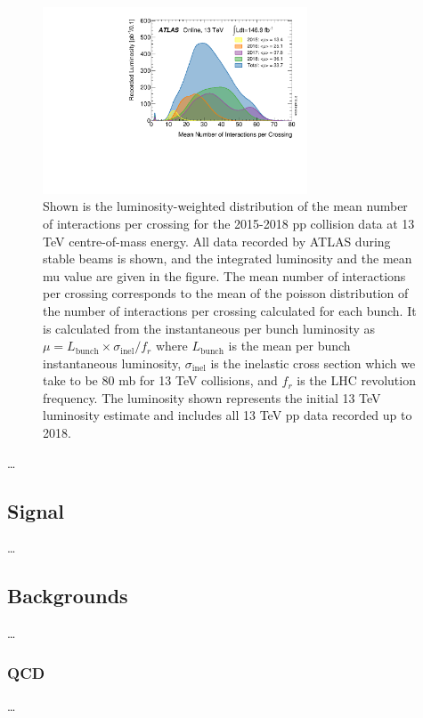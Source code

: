 \begin{figure}[htbp!]
\begin{center}
    \includegraphics[width=0.7\textwidth]{mu_2015_2018}
\end{center}
\caption{
Shown is the luminosity-weighted distribution of the mean number of interactions per crossing for the 2015-2018 pp collision data at 13 TeV centre-of-mass energy.
All data recorded by ATLAS during stable beams is shown, and the integrated luminosity and the mean mu value are given in the figure.
The mean number of interactions per crossing corresponds to the mean of the poisson distribution of the number of interactions per crossing calculated for each bunch.
It is calculated from the instantaneous per bunch luminosity as $\mu = L_{\mathrm{bunch}} × \sigma_{\mathrm{inel}} / f_r$ where $L_{\mathrm{bunch}}$ is the mean per bunch instantaneous luminosity, $\sigma_{\mathrm{inel}}$ is the inelastic cross section which we take to be 80 mb for 13 TeV collisions, and $f_r$ is the LHC revolution frequency.
The luminosity shown represents the initial 13 TeV luminosity estimate and includes all 13 TeV pp data recorded up to 2018.
}
\label{fig:mu_per_year}
\end{figure}

\dots

\subsection{Signal}
\dots

\subsection{Backgrounds}
\dots

\subsubsection{QCD}
\dots

